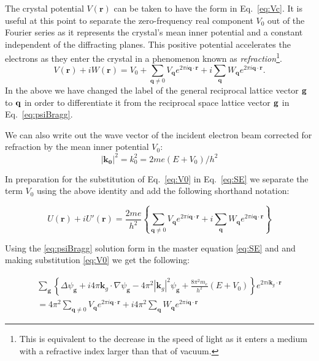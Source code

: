 The crystal potential $V(\mathbf{r})$ can be taken to have the form in Eq.~\ref{eq:Vc}. It is useful at this point to separate the zero-frequency real component $V_0$ out of the Fourier series as it represents the crystal's mean inner potential and a constant independent of the diffracting planes. This positive potential accelerates the electrons as they enter the crystal in a phenomenon known as \textit{refraction}\footnote{ This is equivalent to the decrease in the speed of light as it enters a medium with a refractive index larger than that of vacuum.}.
\begin{equation}
\label{eq:V0}
V(\mathbf{r}) + i W(\mathbf{r}) = V_0 + \sum_{\mathbf{q}\neq 0} V_{\mathbf{q}} e^{2 \pi i \mathbf{q} \cdot \mathbf{r}} + i \sum_\mathbf{q} W_{\mathbf{q}} e^{2 \pi i \mathbf{q} \cdot \mathbf{r}}.
\end{equation}
In the above we have changed the label of the general reciprocal lattice vector $\vb{g}$ to $\vb{q}$ in order to differentiate it from the reciprocal space lattice vector $\vb{g}$ in Eq.~\ref{eq:psiBragg}.


We can also  write out the wave vector of the incident electron beam corrected for refraction by the mean inner potential $V_0$:
\begin{equation}
\label{eq:k0}
 |\mathbf{k_0}|^2 = k_0^2  = 2me(E+V_0)/h^2
\end{equation}

In preparation for the substitution of Eq.~\ref{eq:V0} in Eq.~\ref{eq:SE} we separate the term $V_0$ using the above identity and add the following shorthand notation:

\begin{equation}
U(\mathbf{r}) + iU'(\mathbf{r}) = \frac{2me}{h^2}\left\{ \sum_{\mathbf{q}\neq 0} V_{\mathbf{q}} e^{2 \pi i \mathbf{q} \cdot \mathbf{r}} + i \sum_{\mathbf{q}} W_{\mathbf{q}} e^{2 \pi i \mathbf{q} \cdot \mathbf{r}}\right\}
\end{equation}



Using the \ref{eq:psiBragg} solution form in the master equation \ref{eq:SE} and and making substitution  \ref{eq:V0} we get the following:

\begin{multline}
\sum_\mathbf{g}\left\{\Delta\psi_\mathbf{g} + i 4 \pi \mathbf{k}_g \cdot \nabla \psi_\mathbf{g}  - 4 \pi^2  |\mathbf{k}_g|^2 \psi_\mathbf{g} +\frac{8 \pi^2m_e}{h^2}(E+V_0) \right\} e^{2\pi i\mathbf{k}_g \cdot \mathbf{r}}  \\ =
4 \pi^2\sum_{\mathbf{q}\neq 0} V_{\mathbf{q}} e^{2 \pi i \mathbf{q} \cdot \mathbf{r}} + i 4 \pi^2\sum_\mathbf{q} W_{\mathbf{q}} e^{2 \pi i \mathbf{q} \cdot \mathbf{r}}
\end{multline}




